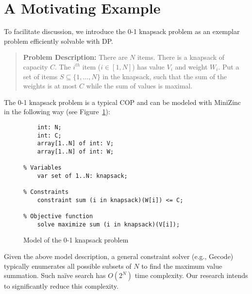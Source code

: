 \section{A Motivating Example}
	To facilitate discussion, we introduce the 0-1 knapsack problem as an exemplar problem efficiently solvable with DP. 
	
	
	\begin{quote}
		\textbf{Problem Description:} There are $N$ items. There is a knapsack of capacity $C$. The $i^{th}$ item ($i \in [1,N]$) has value $V_i$ and weight $W_i$. Put a set of items $S \subseteq \{1,\ldots,N\}$ in the knapsack, such that the sum of the weights is at most $C$ while the sum of values is maximal.  
	\end{quote}
\noindent	
The 0-1 knapsack problem is a typical COP and can be modeled with MiniZinc in the following way (see Figure~\ref{fig:knapsack}):
 
	\begin{figure}[htb]
\begin{lstlisting}[frame=single]
% Input arguments
    int: N;
    int: C;
    array[1..N] of int: V;
    array[1..N] of int: W;

% Variables
    var set of 1..N: knapsack;

% Constraints
    constraint sum (i in knapsack)(W[i]) <= C;

% Objective function
    solve maximize sum (i in knapsack)(V[i]);
\end{lstlisting}
\caption{Model of the 0-1 knapsack problem}\label{fig:knapsack}
\end{figure}
\noindent
Given the above model description, a general  constraint solver (e.g., Gecode) typically enumerates all possible subsets of $N$ to find the maximum value summation. Such na{\"i}ve search has $O(2^N)$ time complexity. Our research intends to significantly reduce this complexity. %
    
 